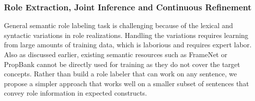 \subsubsection*{Role Extraction, Joint Inference and Continuous Refinement}
General semantic role labeling task is challenging because of the lexical and syntactic variations in role realizations. 
Handling the variations requires learning from large amounts of training data, which is laborious and requires expert labor.
Also as discussed earlier, existing semantic resources such as FrameNet or PropBank cannot be directly used for training as they do not cover the target concepts.
Rather than build a role labeler that can work on any sentence, 
we propose a simpler approach that works well on a smaller subset of sentences that convey role information in expected constructs.

